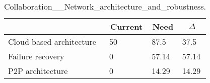
  \begin{table*}[]
  \centering
  \notsotiny
  \caption{ Collaboration__Network_architecture_and_robustness.}
\label{tab:collaboration__network_architecture_and_robustness}
\begin{tabular}{|l|l|l|l|}
  \hline
  \rowcolor[HTML]{C0C0C0}
    \multicolumn{1}{|c|}{Feature} & \multicolumn{1}{c|}{Current} & \multicolumn{1}{c|}{Need} & \multicolumn{1}{c|}{$\Delta$} \\ \hline
  Cloud-based architecture & 50 & 87.5 & 37.5 \\ \hline 
Failure recovery & 0 & 57.14 & 57.14 \\ \hline 
P2P architecture & 0 & 14.29 & 14.29 \\ \hline 
\end{tabular}%
  \end{table*}